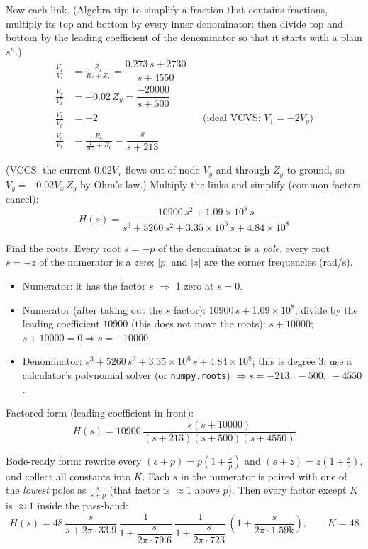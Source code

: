 \documentclass[11pt]{article}
\newcommand{\solstep}[2]{\par\medskip{\color{stepc}\textbf{Step #1 --- #2}}\par\nopagebreak}
\begin{document}
Now each link. {\small (Algebra tip: to simplify a fraction that contains fractions, multiply its top and bottom by every inner denominator; then divide top and bottom by the leading coefficient of the denominator so that it starts with a plain $s^n$.)}
\begin{align*}
\frac{V_{x}}{V_{i}} &= \frac{Z_{x}}{R_{2} + Z_{x}} = \dfrac{0.273\,s + 2730}{s + 4550} \\
\frac{V_{y}}{V_{x}} &= -0.02\,Z_{y} = \dfrac{-20000}{s + 500} \\
\frac{V_{1}}{V_{y}} &= -2 &&\text{(ideal VCVS: $V_{1} = -2V_{y}$)} \\
\frac{V_{o}}{V_{1}} &= \frac{R_{6}}{\frac{1}{sC_{3}} + R_{6}} = \dfrac{s}{s + 213}
\end{align*}

(VCCS: the current $0.02V_{x}$ flows out of node $V_{y}$ and through $Z_{y}$ to ground, so $V_{y} = -0.02V_{x}\,Z_{y}$ by Ohm's law.)
Multiply the links and simplify (common factors cancel):\[
H(s) = \dfrac{10900\,s^{2} + 1.09\times 10^{8}\,s}{s^{3} + 5260\,s^{2} + 3.35\times 10^{6}\,s + 4.84\times 10^{8}}
\]

\solstep{5}{Standard (Bode-ready) form}Find the roots. Every root $s=-p$ of the denominator is a \emph{pole}, every root $s=-z$ of the numerator is a \emph{zero}; $|p|$ and $|z|$ are the corner frequencies (rad/s).
\begin{itemize}[leftmargin=*,itemsep=2pt]
\item Numerator: it has the factor $s$ $\Rightarrow$ 1 zero at $s=0$.
\item Numerator (after taking out the $s$ factor): $10900\,s + 1.09\times 10^{8}$; divide by the leading coefficient $10900$ (this does not move the roots): $s + 10000$; $s + 10000 = 0 \Rightarrow s = -10000$.
\item Denominator: $s^{3} + 5260\,s^{2} + 3.35\times 10^{6}\,s + 4.84\times 10^{8}$; this is degree 3: use a calculator's polynomial solver (or \texttt{numpy.roots}) $\Rightarrow s = -213,\ -500,\ -4550$.
\end{itemize}

Factored form (leading coefficient in front):
\[
H(s) = 10900\,\dfrac{s(s+10000)}{(s+213)(s+500)(s+4550)}
\]

Bode-ready form: rewrite every $(s+p) = p\left(1+\frac{s}{p}\right)$ and $(s+z) = z\left(1+\frac{s}{z}\right)$, and collect all constants into $K$. Each $s$ in the numerator is paired with one of the \emph{lowest} poles as $\frac{s}{s+p}$ (that factor is $\approx 1$ above $p$). Then every factor except $K$ is $\approx 1$ inside the pass-band:
\[
H(s) = 48\,\dfrac{s}{s+2\pi\cdot 33.9}\,\dfrac{1}{1+\dfrac{s}{2\pi\cdot 79.6}}\,\dfrac{1}{1+\dfrac{s}{2\pi\cdot 723}}\,\left(1+\dfrac{s}{2\pi\cdot 1.59\mathrm{k}}\right),\qquad K = 48
\]
\end{document}
